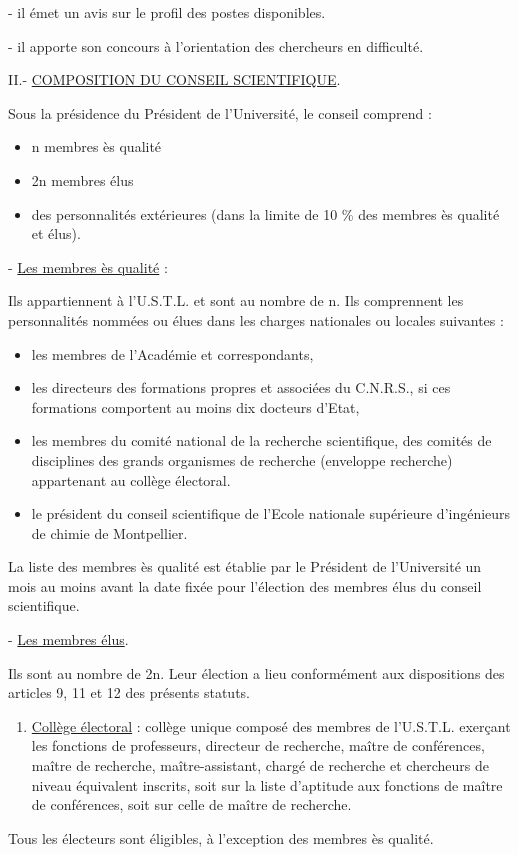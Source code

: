 
- il émet un avis sur le profil des postes disponibles.

- il apporte son concours à l'orientation des chercheurs en difficulté.

II.- \uline{COMPOSITION DU CONSEIL SCIENTIFIQUE}.

Sous la présidence du Président de l'Université, le conseil comprend :
\begin{itemize}[label={},leftmargin=3em]
\item n membres ès qualité
\item 2n membres élus
\item des personnalités extérieures (dans la limite de 10 \% des membres ès qualité et élus).
\end{itemize}

- \uline{Les membres ès qualité} :

Ils appartiennent à l'U.S.T.L. et sont au nombre de n. Ils comprennent les personnalités nommées ou élues dans les charges nationales ou locales suivantes :
\begin{itemize}[label=$\cdot$]
\item les membres de l'Académie et correspondants,
\item les directeurs des formations propres et associées du C.N.R.S., si ces formations comportent au moins dix docteurs d'Etat,
\item les membres du comité national de la recherche scientifique, des comités de disciplines des grands organismes de recherche (enveloppe recherche) appartenant au collège électoral.
\item le président du conseil scientifique de l'Ecole nationale supérieure d'ingénieurs de chimie de Montpellier.
\end{itemize}

La liste des membres ès qualité est établie par le Président de l'Université un mois au moins avant la date fixée pour l'élection des membres élus du conseil scientifique.

- \uline{Les membres élus}.

Ils sont au nombre de 2n. Leur élection a lieu conformément aux dispositions des articles 9, 11 et 12 des présents statuts.

\begin{enumerate}[label=a)-]
\item \uline{Collège électoral} : collège unique composé des membres de l'U.S.T.L. exerçant les fonctions de professeurs, directeur de recherche, maître de conférences, maître de recherche, maître-assistant, chargé de recherche et chercheurs de niveau équivalent inscrits, soit sur la liste d'aptitude aux fonctions de maître de conférences, soit sur celle de maître de recherche.
\end{enumerate}

Tous les électeurs sont éligibles, à l'exception des membres ès qualité.
